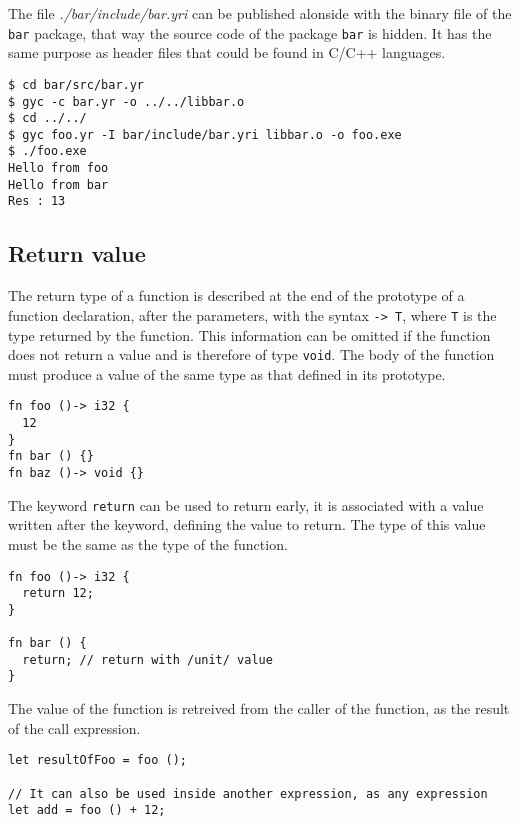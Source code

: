 The file \textit{./bar/include/bar.yri} can be published alonside with the
binary file of the \texttt{bar} package, that way the source code of the package
\texttt{bar} is hidden. It has the same purpose as header files that could be
found in C/C++ languages.

\begin{lstlisting}[style=intermediateVerb]
$ cd bar/src/bar.yr
$ gyc -c bar.yr -o ../../libbar.o
$ cd ../../
$ gyc foo.yr -I bar/include/bar.yri libbar.o -o foo.exe
$ ./foo.exe
Hello from foo
Hello from bar
Res : 13
\end{lstlisting}

\subsection {Return value}

The return type of a function is described at the end of the prototype of a
function declaration, after the parameters, with the syntax \texttt{-> T}, where
\texttt{T} is the type returned by the function. This information can be omitted
if the function does not return a value and is therefore of type \texttt{void}.
The body of the function must produce a value of the same type as that defined
in its prototype.

\begin{lstlisting}[style=coloredverbatim]
fn foo ()-> i32 {
  12
}
fn bar () {}
fn baz ()-> void {}
\end{lstlisting}

The keyword \texttt{return} can be used to return early, it is associated with a
value written after the keyword, defining the value to return. The type of this
value must be the same as the type of the function.

\begin{lstlisting}[style=coloredverbatim]
fn foo ()-> i32 {
  return 12;
}

fn bar () {
  return; // return with /unit/ value
}
\end{lstlisting}

The value of the function is retreived from the caller of the function, as the
result of the call expression.

\begin{lstlisting}[style=coloredverbatim]
let resultOfFoo = foo ();

// It can also be used inside another expression, as any expression
let add = foo () + 12;
\end{lstlisting}

